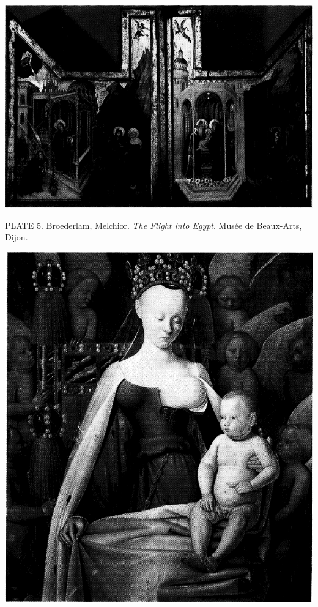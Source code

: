 \protect\hypertarget{20_ILLUSTRATIONS_FOLLOW_PAGE.xhtmlux5cux23id_5}{}{}\includegraphics{include/html/images/325_1.png}

PLATE 5. Broederlam, Melchior. \emph{The Flight into Egypt}. Musée de
Beaux-Arts, Dijon.

\protect\hypertarget{20_ILLUSTRATIONS_FOLLOW_PAGE.xhtmlux5cux23id_6}{}{}\includegraphics{include/html/images/326_1.png}


